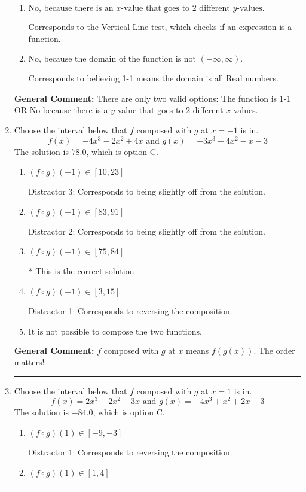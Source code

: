 \documentclass{extbook}[14pt]
\newcommand{\litem}[1]{\item #1

\rule{\textwidth}{0.4pt}}
\begin{document}
\begin{enumerate}
{\begin{enumerate}[label=\Alph*.]
Corresponds to the Horizontal Line test, which this function passes.
\item \( \text{No, because there is an $x$-value that goes to 2 different $y$-values.} \)

Corresponds to the Vertical Line test, which checks if an expression is a function.
\item \( \text{No, because the domain of the function is not $(-\infty, \infty)$.} \)

Corresponds to believing 1-1 means the domain is all Real numbers.
\end{enumerate}

\textbf{General Comment:} There are only two valid options: The function is 1-1 OR No because there is a $y$-value that goes to 2 different $x$-values.
}
\litem{
Choose the interval below that $f$ composed with $g$ at $x=-1$ is in.
\[ f(x) = -4x^{3} -2 x^{2} +4 x \text{ and } g(x) = -3x^{3} -4 x^{2} -x -3 \]The solution is \( 78.0 \), which is option C.\begin{enumerate}[label=\Alph*.]
\item \( (f \circ g)(-1) \in [10, 23] \)

 Distractor 3: Corresponds to being slightly off from the solution.
\item \( (f \circ g)(-1) \in [83, 91] \)

 Distractor 2: Corresponds to being slightly off from the solution.
\item \( (f \circ g)(-1) \in [75, 84] \)

* This is the correct solution
\item \( (f \circ g)(-1) \in [3, 15] \)

 Distractor 1: Corresponds to reversing the composition.
\item \( \text{It is not possible to compose the two functions.} \)


\end{enumerate}

\textbf{General Comment:} $f$ composed with $g$ at $x$ means $f(g(x))$. The order matters!
}
\litem{
Choose the interval below that $f$ composed with $g$ at $x=1$ is in.
\[ f(x) = 2x^{3} +2 x^{2} -3 x \text{ and } g(x) = -4x^{3} + x^{2} +2 x -3 \]The solution is \( -84.0 \), which is option C.\begin{enumerate}[label=\Alph*.]
\item \( (f \circ g)(1) \in [-9, -3] \)

 Distractor 1: Corresponds to reversing the composition.
\item \( (f \circ g)(1) \in [1, 4] \)


\end{enumerate}}
\end{enumerate}
\end{document}
